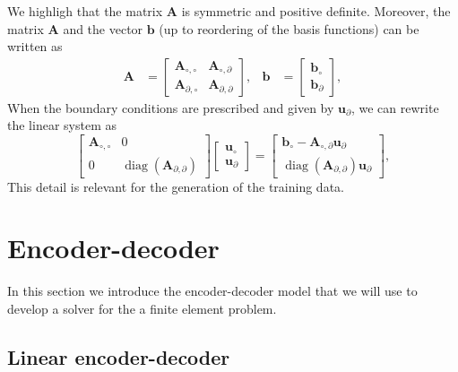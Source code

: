 We highligh that the matrix \(\mathbf{A}\) is symmetric and positive definite.
Moreover, the matrix \(\mathbf{A}\) and the vector \(\mathbf{b}\) (up to reordering of the basis functions) can be written as
\begin{align*}
    \mathbf{A} & = \begin{bmatrix}
        \mathbf{A}_{\circ, \circ} & \mathbf{A}_{\circ, \partial} \\
        \mathbf{A}_{\partial, \circ} & \mathbf{A}_{\partial, \partial}
    \end{bmatrix}, &
    \mathbf{b} & = \begin{bmatrix}
        \mathbf{b}_{\circ} \\
        \mathbf{b}_{\partial}
    \end{bmatrix},
\end{align*}
When the boundary conditions are prescribed and given by \(\mathbf{u}_{\partial}\), we can rewrite the linear system as
\begin{equation}
    \begin{bmatrix}
        \mathbf{A}_{\circ, \circ} & 0 \\
        0 & \operatorname{diag}(\mathbf{A}_{\partial, \partial})
    \end{bmatrix}
    \begin{bmatrix}
        \mathbf{u}_{\circ} \\
        \mathbf{u}_{\partial}
    \end{bmatrix}
    =
    \begin{bmatrix}
        \mathbf{b}_{\circ} - \mathbf{A}_{\circ, \partial} \mathbf{u}_{\partial} \\
        \operatorname{diag}(\mathbf{A}_{\partial, \partial}) \mathbf{u}_{\partial}
    \end{bmatrix},
\end{equation}
This detail is relevant for the generation of the training data.

\section{Encoder-decoder}
\label{sec:e-d}

In this section we introduce the encoder-decoder model that we will use to develop a solver for the a finite element problem.

\subsection{Linear encoder-decoder}

